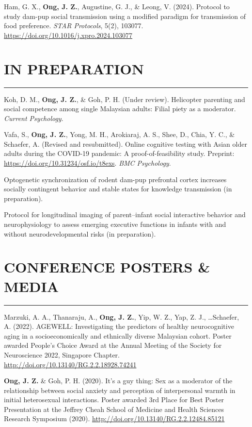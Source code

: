 \documentclass[11pt]{article}
\begin{document}
Ham, G. X., \textbf{Ong, J. Z.}, Augustine, G. J., \& Leong, V. (2024). Protocol to study dam-pup social transmission using a modified paradigm for transmission of food preference. \textit{STAR Protocols}, 5(2), 103077. \href{https://doi.org/10.1016/j.xpro.2024.103077}{https://doi.org/10.1016/j.xpro.2024.103077}

\section*{IN PREPARATION}
\hrule
Koh, D. M., \textbf{Ong, J. Z.}, \& Goh, P. H. (Under review). Helicopter parenting and social competence among single Malaysian adults: Filial piety as a moderator. \textit{Current Psychology}.

Vafa, S., \textbf{Ong, J. Z.}, Yong, M. H., Arokiaraj, A. S., Shee, D., Chia, Y. C., \& Schaefer, A. (Revised and resubmitted). Online cognitive testing with Asian older adults during the COVID-19 pandemic: A proof-of-feasibility study. Preprint: \href{https://doi.org/10.31234/osf.io/t8exs}{https://doi.org/10.31234/osf.io/t8exs}. \textit{BMC Psychology}.

Optogenetic synchronization of rodent dam-pup prefrontal cortex increases socially contingent behavior and stable states for knowledge transmission (in preparation).

Protocol for longitudinal imaging of parent–infant social interactive behavior and neurophysiology to assess emerging executive functions in infants with and without neurodevelopmental risks (in preparation).

\section*{CONFERENCE POSTERS \& MEDIA}
\hrule
Marzuki, A. A., Thanaraju, A., \textbf{Ong, J. Z.}, Yip, W. Z., Yap, Z. J., \dots Schaefer, A. (2022). AGEWELL: Investigating the predictors of healthy neurocognitive aging in a socioeconomically and ethnically diverse Malaysian cohort. Poster awarded People's Choice Award at the Annual Meeting of the Society for Neuroscience 2022, Singapore Chapter. \href{http://doi.org/10.13140/RG.2.2.18928.74241}{http://doi.org/10.13140/RG.2.2.18928.74241}

\textbf{Ong, J. Z.} \& Goh, P. H. (2020). It's a guy thing: Sex as a moderator of the relationship between social anxiety and perception of interpersonal warmth in initial heterosexual interactions. Poster awarded 3rd Place for Best Poster Presentation at the Jeffrey Cheah School of Medicine and Health Sciences Research Symposium (2020). \href{http://doi.org/10.13140/RG.2.2.12484.85121}{http://doi.org/10.13140/RG.2.2.12484.85121}
\end{document}

